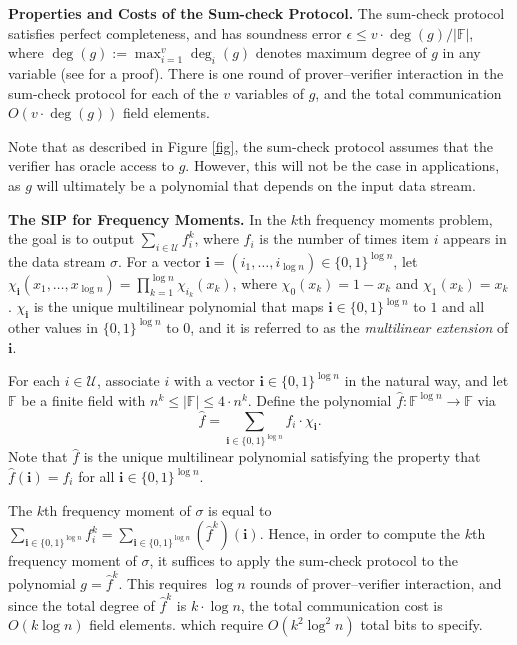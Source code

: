 \documentclass[11pt, letterpaper]{article}
\newcommand{\uni}{\mathcal{U}}
\newcommand{\eps}{\epsilon}
\begin{document}
\medskip
\noindent \textbf{Properties and Costs of the Sum-check Protocol.}
The sum-check protocol satisfies perfect completeness, and has soundness error $\eps \leq v \cdot \deg(g)/|\mathbb{F}|$,
where $\deg(g) := \max_{i=1}^v \deg_i(g)$ denotes maximum degree of $g$ in any variable (see \cite{lfkn} for a proof). 
There is one round of prover--verifier interaction in the sum-check protocol for each
of the $v$ variables of $g$, and the total communication $O(v \cdot \deg(g))$ field elements.

Note that as described in Figure \ref{fig}, the sum-check protocol assumes that the verifier has oracle access to $g$. However, this will not be the case in applications,
as $g$ will ultimately be a polynomial that depends on the input data stream.

\medskip \noindent \textbf{The SIP for Frequency Moments.}
In the $k$th frequency moments problem, the goal is to output $\sum_{i \in \uni} f_i^k$, where $f_i$
is the number of times item $i$ appears in the data stream $\sigma$. 
For a vector $\mathbf{i} = (i_1, \dots, i_{\log n}) \in \{0, 1\}^{\log n}$, let 
$\chi_{\mathbf{i}}(x_1, \dots, x_{\log n})= \prod_{k=1}^{\log n}
\chi_{i_k}(x_k)$, where $\chi_0(x_k) = 1 -x_k$ and $\chi_1(x_k) = x_k$. $\chi_{\mathbf{i}}$ is the unique multilinear polynomial that maps 
$\mathbf{i} \in \{0, 1\}^{\log n}$
to $1$ and all other values in $\{0, 1\}^{\log n}$ to 0, and it is referred to
as the \emph{multilinear extension} of $\mathbf{i}$. 

For each $i \in \uni$, associate $i$ with a vector $\mathbf{i} \in \{0, 1\}^{\log n}$ in the natural way, and
let $\mathbb{F}$ be a finite field with $n^k \leq |\mathbb{F}| \leq 4 \cdot n^k$.
Define the polynomial $\hat{f}\colon \mathbb{F}^{\log n} \rightarrow \mathbb{F}$ via
\begin{equation}\label{eq} \hat{f} = \sum_{\mathbf{i} \in \{0,1\}^{\log n}} f_{i} \cdot \chi_{\mathbf{i}}. \end{equation}
Note that $\hat{f}$ is the unique multilinear polynomial satisfying the property that $\hat{f}(\mathbf{i}) = f_i$ for all
$\mathbf{i} \in \{0, 1\}^{\log n}$.

The $k$th frequency moment of $\sigma$ is equal to $\sum_{\mathbf{i} \in \{0, 1\}^{\log n}} f_i^k = \sum_{\mathbf{i} \in \{0, 1\}^{\log n}} (\hat{f}^k)(\mathbf{i})$.
Hence, in order to compute the $k$th frequency moment of $\sigma$, 
it suffices to apply the sum-check protocol to the polynomial $g=\hat{f}^k$. 
This requires $\log n$ rounds of prover--verifier interaction, and since the total degree of $\hat{f}^k$ is $k \cdot \log n$, 
the total communication cost is $O(k \log n)$ field elements.
which require $O(k^2 \log^2 n)$ total bits to specify. 
\end{document}

